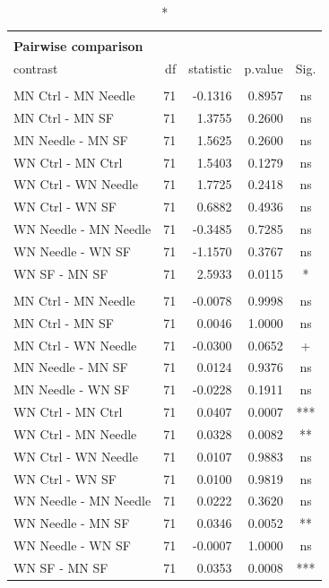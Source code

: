\documentclass[
  12pt,
  letterpaper,
]{article}
\begin{document}
\begingroup
\fontsize{12.0pt}{14.4pt}\selectfont
\begin{longtable}{l|rrrc}
\caption*{
{\large \textbf{Appendix Table 178}} \\ 
{\small \textbf{Pairwise comparison}}
} \\ 
\toprule
contrast & {df} & {statistic} & {p.value} & {Sig.} \\ 
\midrule\addlinespace[2.5pt]
\multicolumn{5}{l}{Liver} \\[2.5pt] 
\midrule\addlinespace[2.5pt]
MN Ctrl - MN Needle & 71 & -0.1316 & 0.8957 & ns \\ 
MN Ctrl - MN SF & 71 & 1.3755 & 0.2600 & ns \\ 
MN Needle - MN SF & 71 & 1.5625 & 0.2600 & ns \\ 
WN Ctrl - MN Ctrl & 71 & 1.5403 & 0.1279 & ns \\ 
WN Ctrl - WN Needle & 71 & 1.7725 & 0.2418 & ns \\ 
WN Ctrl - WN SF & 71 & 0.6882 & 0.4936 & ns \\ 
WN Needle - MN Needle & 71 & -0.3485 & 0.7285 & ns \\ 
WN Needle - WN SF & 71 & -1.1570 & 0.3767 & ns \\ 
WN SF - MN SF & 71 & 2.5933 & 0.0115 & * \\ 
\midrule\addlinespace[2.5pt]
\multicolumn{5}{l}{Spleen} \\[2.5pt] 
\midrule\addlinespace[2.5pt]
MN Ctrl - MN Needle & 71 & -0.0078 & 0.9998 & ns \\ 
MN Ctrl - MN SF & 71 & 0.0046 & 1.0000 & ns \\ 
MN Ctrl - WN Needle & 71 & -0.0300 & 0.0652 & + \\ 
MN Needle - MN SF & 71 & 0.0124 & 0.9376 & ns \\ 
MN Needle - WN SF & 71 & -0.0228 & 0.1911 & ns \\ 
WN Ctrl - MN Ctrl & 71 & 0.0407 & 0.0007 & *** \\ 
WN Ctrl - MN Needle & 71 & 0.0328 & 0.0082 & ** \\ 
WN Ctrl - WN Needle & 71 & 0.0107 & 0.9883 & ns \\ 
WN Ctrl - WN SF & 71 & 0.0100 & 0.9819 & ns \\ 
WN Needle - MN Needle & 71 & 0.0222 & 0.3620 & ns \\ 
WN Needle - MN SF & 71 & 0.0346 & 0.0052 & ** \\ 
WN Needle - WN SF & 71 & -0.0007 & 1.0000 & ns \\ 
WN SF - MN SF & 71 & 0.0353 & 0.0008 & *** \\ 
\bottomrule
\end{longtable}
\endgroup
\end{document}
